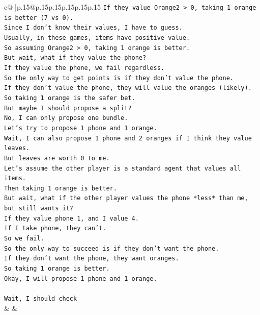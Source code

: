 \documentclass{article}
\begin{document}
{\begin{supertabular}{c@{$\;$}|p{.15\linewidth}@{}p{.15\linewidth}p{.15\linewidth}p{.15\linewidth}p{.15\linewidth}p{.15\linewidth}}
{{{\texttt{If they value Orange2 > 0, taking 1 orange is better (7 vs 0).} \\
\texttt{Since I don't know their values, I have to guess.} \\
\texttt{Usually, in these games, items have positive value.} \\
\texttt{So assuming Orange2 > 0, taking 1 orange is better.} \\
\texttt{But wait, what if they value the phone?} \\
\texttt{If they value the phone, we fail regardless.} \\
\texttt{So the only way to get points is if they don't value the phone.} \\
\texttt{If they don't value the phone, they will value the oranges (likely).} \\
\texttt{So taking 1 orange is the safer bet.} \\
\texttt{But maybe I should propose a split?} \\
\texttt{No, I can only propose one bundle.} \\
\texttt{Let's try to propose 1 phone and 1 orange.} \\
\texttt{Wait, I can also propose 1 phone and 2 oranges if I think they value leaves.} \\
\texttt{But leaves are worth 0 to me.} \\
\texttt{Let's assume the other player is a standard agent that values all items.} \\
\texttt{Then taking 1 orange is better.} \\
\texttt{But wait, what if the other player values the phone *less* than me, but still wants it?} \\
\texttt{If they value phone 1, and I value 4.} \\
\texttt{If I take phone, they can't.} \\
\texttt{So we fail.} \\
\texttt{So the only way to succeed is if they don't want the phone.} \\
\texttt{If they don't want the phone, they want oranges.} \\
\texttt{So taking 1 orange is better.} \\
\texttt{Okay, I will propose 1 phone and 1 orange.} \\
\\ 
\texttt{Wait, I should check} \\
            }
        }
    }
    & & \\ \\


\end{supertabular}}
\end{document}

